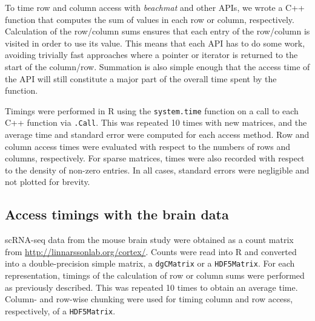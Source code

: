 \documentclass[10pt,letterpaper]{article}
\newcommand{\beachmat}{\textit{beachmat}}
\newcommand{\code}[1]{\texttt{#1}}
\begin{document}
To time row and column access with \beachmat{} and other APIs, we wrote a C++ function that computes the sum of values in each row or column, respectively.
Calculation of the row/column sums ensures that each entry of the row/column is visited in order to use its value.
This means that each API has to do some work, avoiding trivially fast approaches where a pointer or iterator is returned to the start of the column/row.
Summation is also simple enough that the access time of the API will still constitute a major part of the overall time spent by the function.

Timings were performed in R using the \code{system.time} function on a call to each C++ function via \code{.Call}. 
This was repeated 10 times with new matrices, and the average time and standard error were computed for each access method. 
Row and column access times were evaluated with respect to the numbers of rows and columns, respectively.
For sparse matrices, times were also recorded with respect to the density of non-zero entries.
In all cases, standard errors were negligible and not plotted for brevity.

\subsection*{Access timings with the brain data}
scRNA-seq data from the mouse brain study \cite{zeisel2015brain} were obtained as a count matrix from \url{http://linnarssonlab.org/cortex/}.
Counts were read into R and converted into a double-precision simple matrix, a \code{dgCMatrix} or a \code{HDF5Matrix}.
For each representation, timings of the calculation of row or column sums were performed as previously described.
This was repeated 10 times to obtain an average time.
Column- and row-wise chunking were used for timing column and row access, respectively, of a \code{HDF5Matrix}.

{\small
    
    
}
\end{document}
